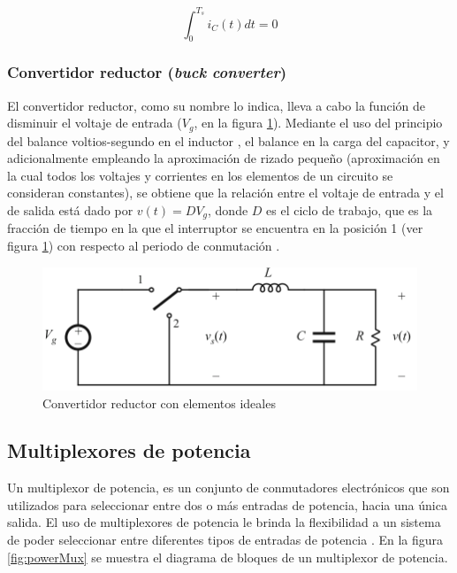 \begin{equation}
    \int_0^{T_s} i_C(t) d t = 0
    \label{eq:balanceCarga}
\end{equation}

\subsubsection*{Convertidor reductor (\textit{buck converter})}

El convertidor reductor, como su nombre lo indica, lleva a cabo la función de disminuir el voltaje de entrada ($V_g$, en la figura \ref{fig:buck}). Mediante el uso del principio del
balance voltios-segundo en el inductor , el balance en la carga del capacitor, y adicionalmente empleando la aproximación de rizado pequeño (aproximación en la cual todos los 
voltajes y corrientes en los elementos de un circuito se consideran constantes), se obtiene que la relación entre el voltaje de entrada y el de salida está dado por $v(t)=DV_g$, donde $D$ es el ciclo de trabajo, que es la fracción de tiempo en la que el interruptor se encuentra en la posición 1 (ver figura \ref{fig:buck}) con respecto al periodo de conmutación \cite{erickson_fundamentals_2020}.

\begin{figure}[H]
    \centering
    \includegraphics[scale=0.5]{imagenes/buckIdeal.png}
    \caption{Convertidor reductor con elementos ideales \cite{erickson_fundamentals_2020}}
    \label{fig:buck}
\end{figure}


\subsection*{Multiplexores de potencia}

Un multiplexor de potencia, es un conjunto de conmutadores electrónicos que son utilizados
para seleccionar entre dos o más entradas de potencia, hacia una única salida. El uso de 
multiplexores de potencia le brinda la flexibilidad a un sistema de poder seleccionar
entre diferentes tipos de entradas de potencia \cite{triano_basics_2020}. En la figura 
\ref{fig:powerMux} se muestra el diagrama de bloques de un multiplexor de potencia.


